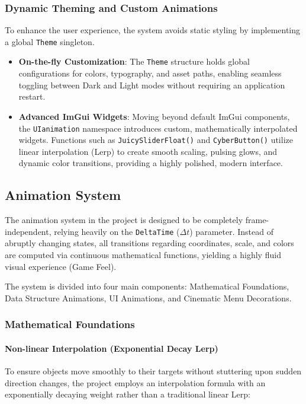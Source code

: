 \subsubsection{Dynamic Theming and Custom Animations}
To enhance the user experience, the system avoids static styling by implementing a global \texttt{Theme} singleton.
\begin{itemize}
    \item \textbf{On-the-fly Customization}: The \texttt{Theme} structure holds global configurations for colors, typography, and asset paths, enabling seamless toggling between Dark and Light modes without requiring an application restart.
    \item \textbf{Advanced ImGui Widgets}: Moving beyond default ImGui components, the \texttt{UIanimation} namespace introduces custom, mathematically interpolated widgets. Functions such as \texttt{JuicySliderFloat()} and \texttt{CyberButton()} utilize linear interpolation (Lerp) to create smooth scaling, pulsing glows, and dynamic color transitions, providing a highly polished, modern interface.
\end{itemize}

\subsection{Animation System}

The animation system in the project is designed to be completely frame-independent, relying heavily on the \texttt{DeltaTime} ($\Delta t$) parameter. Instead of abruptly changing states, all transitions regarding coordinates, scale, and colors are computed via continuous mathematical functions, yielding a highly fluid visual experience (Game Feel).

The system is divided into four main components: Mathematical Foundations, Data Structure Animations, UI Animations, and Cinematic Menu Decorations.

\subsubsection{Mathematical Foundations}

\paragraph{Non-linear Interpolation (Exponential Decay Lerp)} 
To ensure objects move smoothly to their targets without stuttering upon sudden direction changes, the project employs an interpolation formula with an exponentially decaying weight rather than a traditional linear Lerp:

